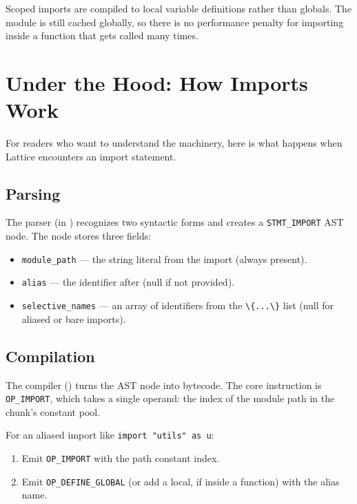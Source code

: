 Scoped imports are compiled to local variable definitions rather than globals.
The module is still cached globally, so there is no performance penalty for importing inside a function that gets called many times.

\section{Under the Hood: How Imports Work}\label{sec:import-internals}

For readers who want to understand the machinery, here is what happens when Lattice encounters an import statement.

\subsection{Parsing}\label{subsec:import-parsing}

The parser (in ) recognizes two syntactic forms and creates a \lstinline|STMT_IMPORT| AST node.
The node stores three fields:

\begin{itemize}[nosep]
  \item \lstinline|module_path| --- the string literal from the import (always present).
  \item \lstinline|alias| --- the identifier after  (null if not provided).
  \item \lstinline|selective_names| --- an array of identifiers from the \lstinline|\{...\}| list (null for aliased or bare imports).
\end{itemize}

\subsection{Compilation}\label{subsec:import-compilation}

The compiler () turns the AST node into bytecode.
The core instruction is \lstinline|OP_IMPORT|, which takes a single operand: the index of the module path in the chunk's constant pool.

For an aliased import like \lstinline|import "utils" as u|:

\begin{enumerate}[nosep]
  \item Emit \lstinline|OP_IMPORT| with the path constant index.
  \item Emit \lstinline|OP_DEFINE_GLOBAL| (or add a local, if inside a function) with the alias name.
\end{enumerate}


